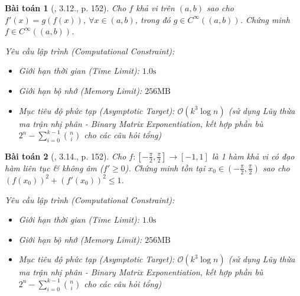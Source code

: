 \documentclass{article}
\newtheorem{baitoan}{Bài toán}
\begin{document}
\begin{baitoan}[\cite{Quoc_Long_Dat_Nam_VMC}, 3.12., p. 152]
	Cho $f$ khả vi trên $(a,b)$ sao cho $f'(x) = g(f(x))$, $\forall x\in(a,b)$, trong đó $g\in C^\infty((a,b))$. Chứng minh $f\in C^\infty((a,b))$.

    \vspace{0.5em}
    \emph{Yêu cầu lập trình (Computational Constraint):}
    \begin{itemize}
        \item Giới hạn thời gian (Time Limit): $1.0\mathrm{s}$
        \item Giới hạn bộ nhớ (Memory Limit): $256\mathrm{MB}$
        \item Mục tiêu độ phức tạp (Asymptotic Target): $\mathcal{O}(k^3 \log n)$ (sử dụng Lũy thừa ma trận nhị phân - Binary Matrix Exponentiation, kết hợp phần bù $2^n - \sum_{i=0}^{k-1} \binom{n}{i}$ cho các câu hỏi tổng)
    \end{itemize}
\end{baitoan}


\begin{baitoan}[\cite{Quoc_Long_Dat_Nam_VMC}, 3.14., p. 152]
	Cho $f:\left[-\frac{\pi}{2},\frac{\pi}{2}\right]\to[-1,1]$ là 1 hàm khả vi có đạo hàm liên tục \& không âm ($f'\ge0$). Chứng minh tồn tại $x_0\in\left(-\frac{\pi}{2},\frac{\pi}{2}\right)$ sao cho $(f(x_0))^2 + (f'(x_0))^2\le1$.

    \vspace{0.5em}
    \emph{Yêu cầu lập trình (Computational Constraint):}
    \begin{itemize}
        \item Giới hạn thời gian (Time Limit): $1.0\mathrm{s}$
        \item Giới hạn bộ nhớ (Memory Limit): $256\mathrm{MB}$
        \item Mục tiêu độ phức tạp (Asymptotic Target): $\mathcal{O}(k^3 \log n)$ (sử dụng Lũy thừa ma trận nhị phân - Binary Matrix Exponentiation, kết hợp phần bù $2^n - \sum_{i=0}^{k-1} \binom{n}{i}$ cho các câu hỏi tổng)
    \end{itemize}
\end{baitoan}
\end{document}
